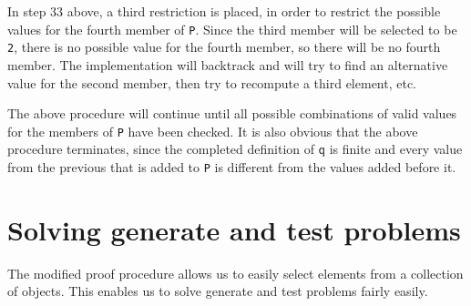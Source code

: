 \documentclass[inscr,ack,preface]{dithesis}
\theoremstyle{definition}
\newcommand{\msf}[1]{$\mathsf{#1}$}
\begin{document}
In step 33 above, a third restriction is placed, in order to restrict the possible values for the fourth member of \texttt{P}. Since the third member will be selected to be \texttt{2}, there is no possible value for the fourth member, so there will be no fourth member. The implementation will backtrack and will try to find an alternative value for the second member, then try to recompute a third element, etc.

The above procedure will continue until all possible combinations of valid values for the members of \texttt{P} have been checked. It is also obvious that the above procedure terminates, since the completed definition of \msf{q} is finite and every value from the previous that is added to \texttt{P} is different from the values added before it.

\section{Solving generate and test problems}
The modified proof procedure allows us to easily select elements from a collection of objects. This enables us to solve generate and test problems fairly easily.
\end{document}
